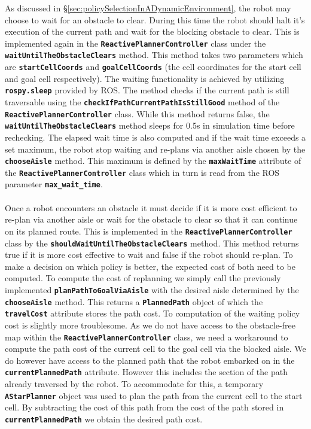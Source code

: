 \documentclass[a4paper,12pt]{article}
\begin{document}
		As discussed in \S \ref{sec:policySelectionInADynamicEnvironment}, the robot may choose to wait for an obstacle to clear. During this time the robot should halt it's execution of the current path and wait for the blocking obstacle to clear. This is implemented again in the \textbf{\texttt{ReactivePlannerController}} class under the \textbf{\texttt{waitUntilTheObstacleClears}} method. This method takes two parameters which are \textbf{\texttt{startCellCoords}} and \textbf{\texttt{goalCellCoords}} (the cell coordinates for the start cell and goal cell respectively). The waiting functionality is achieved by utilizing \textbf{\texttt{rospy.sleep}} provided by ROS. The method checks if the current path is still traversable using the \textbf{\texttt{checkIfPathCurrentPathIsStillGood}} method of the \textbf{\texttt{ReactivePlannerController}} class. While this method returns false, the \textbf{\texttt{waitUntilTheObstacleClears}} method sleeps for 0.5s in simulation time before rechecking. The elapsed wait time is also computed and if the wait time exceeds a set maximum, the robot stop waiting and re-plans via another aisle chosen by the \textbf{\texttt{chooseAisle}} method. This maximum is defined by the \textbf{\texttt{maxWaitTime}} attribute of the \textbf{\texttt{ReactivePlannerController}} class which in turn is read from the ROS parameter \textbf{\texttt{max\_wait\_time}}.
		\\
		\\
		Once a robot encounters an obstacle it must decide if it is more cost efficient to re-plan via another aisle or wait for the obstacle to clear so that it can continue on its planned route. This is implemented in the \textbf{\texttt{ReactivePlannerController}} class by the \textbf{\texttt{shouldWaitUntilTheObstacleClears}} method. This method returns true if it is more cost effective to wait and false if the robot should re-plan. To make a decision on which policy is better, the expected cost of both need to be computed. To compute the cost of replanning we simply call the previously implemented \textbf{\texttt{planPathToGoalViaAisle}} with the desired aisle determined by the \textbf{\texttt{chooseAisle}} method. This returns a \textbf{\texttt{PlannedPath}} object of which the \textbf{\texttt{travelCost}} attribute stores the path cost. To computation of the waiting policy cost is slightly more troublesome. As we do not have access to the obstacle-free map within the \textbf{\texttt{ReactivePlannerController}} class, we need a workaround to compute the path cost of the current cell to the goal cell via the blocked aisle. We do however have access to the planned path that the robot embarked on in the \textbf{\texttt{currentPlannedPath}} attribute. However this includes the section of the path already traversed by the robot. To accommodate for this, a temporary \textbf{\texttt{AStarPlanner}} object was used to plan the path from the current cell to the start cell. By subtracting the cost of this path from the cost of the path stored in \textbf{\texttt{currentPlannedPath}} we obtain the desired path cost.
\end{document}
